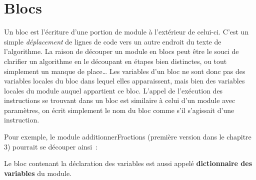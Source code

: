 \section{Blocs}

	{
	{Un bloc est l’écriture d’une portion de module
	à l’extérieur de celui-ci. C’est un simple
	}{\textit{déplacement}}{
	de lignes de code vers un autre endroit du texte de
	l’algorithme. La raison de découper un module en blocs
	peut être le souci de clarifier un algorithme en le découpant en étapes
    bien distinctes, ou tout simplement un manque de place\dots{} Les variables
	d’un bloc ne sont donc pas des variables locales du bloc dans lequel
	elles apparaissent, mais bien des variables locales du module auquel
	appartient ce bloc. L’appel de l’exécution des instructions se trouvant
	dans un bloc est similaire à celui d’un module avec paramètres, on
	écrit simplement le nom du bloc comme s’il s’agissait d’une
	instruction.}}

	{
	Pour exemple, le module additionnerFractions (première version dans le
	chapitre 3) pourrait se découper ainsi~:}






	{
	{Le bloc contenant la déclaration des variables
	est aussi appelé }{\textbf{dictionnaire des
	variables}}{ du module.}}

